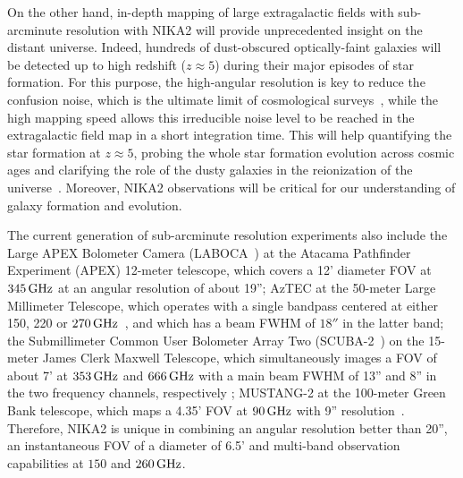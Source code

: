 On the other hand, in-depth mapping of large extragalactic fields with
sub-arcminute resolution with NIKA2 will provide unprecedented insight
on the distant universe. %
Indeed, hundreds of dust-obscured optically-faint galaxies will be
detected up to high redshift
($z \approx 5$) during their major episodes of star formation.
{\lp For this purpose, the high-angular resolution is key to reduce the
confusion noise, which is the ultimate limit of cosmological
surveys~\citep{Bethermin2017_simu}, while the high mapping speed allows
this irreducible noise level to be reached in the extragalactic field
map in a short integration time.}
This will help quantifying the star formation at $z \approx 5$, probing the whole
star formation evolution across cosmic ages and clarifying the
role of the dusty galaxies in the reionization of the
universe~\citep{Mancuso2016}. Moreover, NIKA2 observations will be critical for our
understanding of galaxy formation and evolution.


The current generation of sub-arcminute resolution experiments also
include the Large APEX Bolometer Camera
(LABOCA~\citep{Siringo2009_LABOCA}) at the Atacama
Pathfinder Experiment (APEX) 12-meter telescope, which covers a
12' diameter FOV at $345\, \rm{GHz}$ {\lp at an angular resolution of about
19''}; AzTEC at the 50-meter Large Millimeter Telescope, which operates with a
single bandpass centered at either 150, 220 or
$270\,\rm{GHz}$~\citep{Wilson2008_AZTEC}, {\lp and which has a beam FWHM of
$18''$ in the latter band}; the Submillimeter Common User Bolometer
Array Two (SCUBA-2~\citep{Holland2013_SCUBA2,Dempsey2013_SCUBA2}) on the
15-meter James Clerk Maxwell Telescope, which simultaneously
images a FOV of about 7' %
at $353\,\rm{GHz}$ and $666\,\rm{GHz}$ {\lp with a main beam FWHM of 13''
and 8'' in the two frequency channels, respectively}
; MUSTANG-2 at the 100-meter Green Bank telescope,
which maps a 4.35' FOV at 
$90\,\rm{GHz}$ {\lp with 9'' resolution}~\citep{Dicker2014_MUSTANG2, Stanchfield2016_MUSTANG2}.
Therefore, NIKA2 is unique
in combining an angular resolution better than 20'', an instantaneous FOV of a
diameter of 6.5' and multi-band observation capabilities at $150$ and
$260\,\rm{GHz}$.


